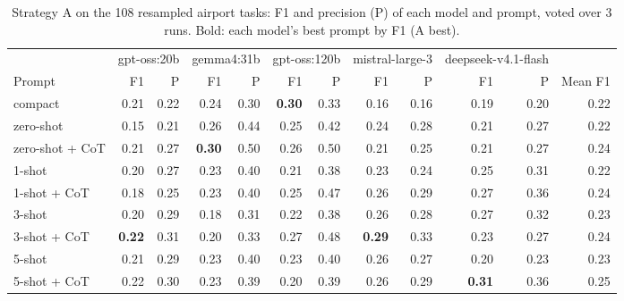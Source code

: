 \begin{table}[t]
\centering
\caption{Strategy A on the 108 resampled airport tasks: F1 and precision (P) of each model and prompt, voted over 3 runs. Bold: each model's best prompt by F1 (A best).}
\label{tab:strategy-a-prompts}
\small
\setlength{\tabcolsep}{3.5pt}
\begin{tabular}{lrrrrrrrrrrr}
\toprule
 & \multicolumn{2}{c}{gpt-oss:20b} & \multicolumn{2}{c}{gemma4:31b} & \multicolumn{2}{c}{gpt-oss:120b} & \multicolumn{2}{c}{mistral-large-3} & \multicolumn{2}{c}{deepseek-v4.1-flash} & \\
\cmidrule(lr){2-3}\cmidrule(lr){4-5}\cmidrule(lr){6-7}\cmidrule(lr){8-9}\cmidrule(lr){10-11}
Prompt & F1 & P & F1 & P & F1 & P & F1 & P & F1 & P & Mean F1 \\
\midrule
compact & 0.21 & 0.22 & 0.24 & 0.30 & \textbf{0.30} & 0.33 & 0.16 & 0.16 & 0.19 & 0.20 & 0.22 \\
zero-shot & 0.15 & 0.21 & 0.26 & 0.44 & 0.25 & 0.42 & 0.24 & 0.28 & 0.21 & 0.27 & 0.22 \\
zero-shot + CoT & 0.21 & 0.27 & \textbf{0.30} & 0.50 & 0.26 & 0.50 & 0.21 & 0.25 & 0.21 & 0.27 & 0.24 \\
1-shot & 0.20 & 0.27 & 0.23 & 0.40 & 0.21 & 0.38 & 0.23 & 0.24 & 0.25 & 0.31 & 0.22 \\
1-shot + CoT & 0.18 & 0.25 & 0.23 & 0.40 & 0.25 & 0.47 & 0.26 & 0.29 & 0.27 & 0.36 & 0.24 \\
3-shot & 0.20 & 0.29 & 0.18 & 0.31 & 0.22 & 0.38 & 0.26 & 0.28 & 0.27 & 0.32 & 0.23 \\
3-shot + CoT & \textbf{0.22} & 0.31 & 0.20 & 0.33 & 0.27 & 0.48 & \textbf{0.29} & 0.33 & 0.23 & 0.27 & 0.24 \\
5-shot & 0.21 & 0.29 & 0.23 & 0.40 & 0.23 & 0.40 & 0.26 & 0.27 & 0.20 & 0.23 & 0.23 \\
5-shot + CoT & 0.22 & 0.30 & 0.23 & 0.39 & 0.20 & 0.39 & 0.26 & 0.29 & \textbf{0.31} & 0.36 & 0.25 \\
\bottomrule
\end{tabular}
\end{table}
